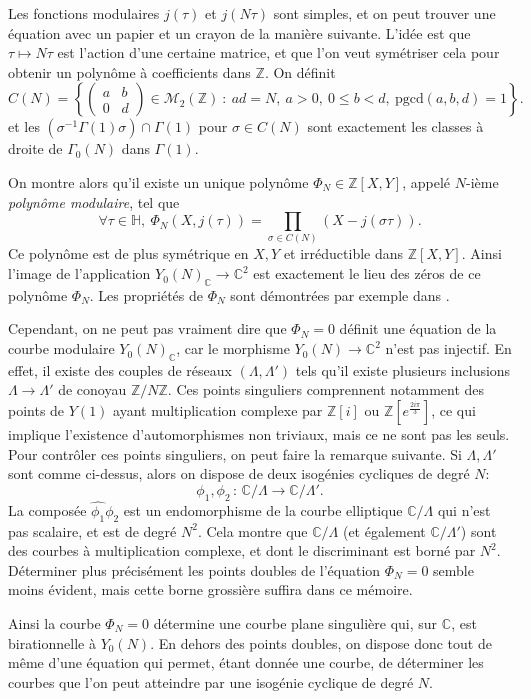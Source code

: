 \documentclass[11pt,a4paper]{article}
\newcommand{\Z}{\mathbb{Z}}
\newcommand{\C}{\mathbb{C}}
\renewcommand{\H}{\mathbb{H}}
\newcommand{\M}{\mathcal{M}}
\newcommand{\vers}{\longrightarrow}
\newcommand{\de}{\,:\,}
\theoremstyle{definition}
\begin{document}
Les fonctions modulaires $j(\tau)$ et $j(N\tau)$ sont simples, et on peut trouver une équation avec un papier et un crayon de la manière suivante. L'idée est que $\tau\mapsto N\tau$ est l'action d'une certaine matrice, et que l'on veut symétriser cela pour obtenir un polynôme à coefficients dans $\Z$. On définit
$$C(N)=\left\{ 
\left(
\begin{matrix}
a & b \\
0 & d 
\end{matrix}
\right)
\in \M_2(\Z)\ :\ ad=N,\ a>0,\ 0\leq b<d,\ \mathrm{pgcd}(a,b,d)=1\right\}.$$
et les $(\sigma^{-1}\Gamma(1)\sigma)\cap \Gamma(1)$ pour $\sigma\in C(N)$ sont exactement les classes à droite de $\Gamma_0(N)$ dans $\Gamma(1)$.

On montre alors qu'il existe un unique  polynôme $\Phi_N \in \Z[X,Y]$, appelé $N$-ième \emph{polynôme modulaire}, tel que
$$\forall \tau\in\H,\ \Phi_N(X,j(\tau))=\prod_{\sigma\in C(N)} (X-j(\sigma\tau)).$$
Ce polynôme est de plus symétrique en $X, Y$ et irréductible dans $\Z[X, Y]$. Ainsi l'image de l'application $Y_0(N)_\C\vers \C^2$ est exactement le lieu des zéros de ce polynôme $\Phi_N$. Les propriétés de $\Phi_N$ sont démontrées par exemple dans \cite{Sil2}.

Cependant, on ne peut pas vraiment dire que $\Phi_N=0$ définit une équation de la courbe modulaire $Y_0(N)_\C$, car le morphisme $Y_0(N)\vers \C^2$ n'est pas injectif. En effet, il existe des couples de réseaux $(\Lambda, \Lambda')$ tels qu'il existe plusieurs inclusions $\Lambda\vers\Lambda'$ de conoyau $\Z/N\Z$. Ces points singuliers comprennent notamment des points de $Y(1)$ ayant multiplication complexe par $\Z[i]$ ou $\Z[e^{\frac{2i\pi}{3}}]$, ce qui implique l'existence d'automorphismes non triviaux, mais ce ne sont pas les seuls. Pour contrôler ces points singuliers, on peut faire la remarque suivante. Si $\Lambda, \Lambda'$ sont comme ci-dessus, alors on dispose de deux isogénies cycliques de degré $N$:
$$\phi_1, \phi_2\de \C/\Lambda \vers \C/\Lambda'.$$
La composée $\widehat{\phi_1} \phi_2$ est un endomorphisme de la courbe elliptique $\C/\Lambda$ qui n'est pas scalaire, et est de degré $N^2$. Cela montre que $\C/\Lambda$ (et également $\C/\Lambda'$) sont des courbes à multiplication complexe, et dont le discriminant est borné par $N^2$. Déterminer plus précisément les points doubles de l'équation $\Phi_N = 0$ semble moins évident, mais cette borne grossière suffira dans ce mémoire.

Ainsi la courbe $\Phi_N=0$ détermine une courbe plane singulière qui, sur $\C$, est birationnelle à $Y_0(N)$. En dehors des points doubles, on dispose donc tout de même d'une équation qui permet, étant donnée une courbe, de déterminer les courbes que l'on peut atteindre par une isogénie cyclique de degré $N$.
\end{document}
